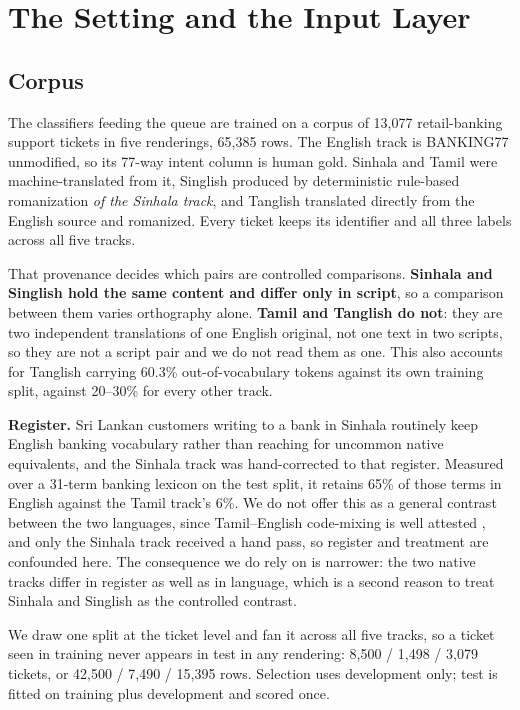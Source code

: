 \section{The Setting and the Input Layer}
\label{sec:setting}

\subsection{Corpus}

The classifiers feeding the queue are trained on a corpus of 13{,}077
retail-banking support tickets in five renderings, 65{,}385 rows. The English
track is BANKING77 \cite{casanueva2020banking77} unmodified, so its 77-way intent
column is human gold. Sinhala and Tamil were machine-translated from it, Singlish
produced by deterministic rule-based romanization \emph{of the Sinhala track},
and Tanglish translated directly from the English source and romanized. Every
ticket keeps its identifier and all three labels across all five tracks.

That provenance decides which pairs are controlled comparisons.
\textbf{Sinhala and Singlish hold the same content and differ only in script}, so
a comparison between them varies orthography alone. \textbf{Tamil and Tanglish do
not}: they are two independent translations of one English original, not one text
in two scripts, so they are not a script pair and we do not read them as one.
This also accounts for Tanglish carrying 60.3\% out-of-vocabulary tokens against
its own training split, against 20--30\% for every other track.

\textbf{Register.} Sri Lankan customers writing to a bank in Sinhala routinely
keep English banking vocabulary rather than reaching for uncommon native
equivalents, and the Sinhala track was hand-corrected to that register. Measured
over a 31-term banking lexicon on the test split, it retains 65\% of those terms
in English against the Tamil track's 6\%. We do not offer this as a general
contrast between the two languages, since Tamil--English code-mixing is well
attested \cite{chakravarthi2020tamilmix}, and only the Sinhala track received a
hand pass, so register and treatment are confounded here. The consequence we do
rely on is narrower: the two native tracks differ in register as well as in
language, which is a second reason to treat Sinhala and Singlish as the
controlled contrast.

We draw one split at the ticket level and fan it across all five tracks, so a
ticket seen in training never appears in test in any rendering: 8{,}500 / 1{,}498
/ 3{,}079 tickets, or 42{,}500 / 7{,}490 / 15{,}395 rows. Selection uses
development only; test is fitted on training plus development and scored once.

